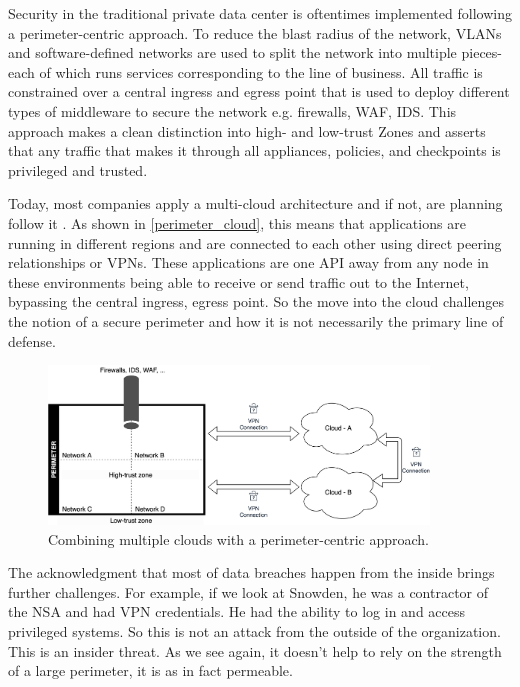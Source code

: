 \documentclass[runningheads]{llncs}
\begin{document}
Security in the traditional private data center is oftentimes implemented following a perimeter-centric approach. To reduce the blast radius of the network, VLANs and software-defined networks are used to split the network into multiple pieces-each of which runs services corresponding to the line of business. All traffic is constrained over a central ingress and egress point that is used to deploy different types of middleware to secure the network e.g. firewalls, WAF, IDS. This approach makes a clean distinction into high- and low-trust Zones and asserts that any traffic that makes it through all appliances, policies, and checkpoints is privileged and trusted. 

Today, most companies apply a multi-cloud architecture and if not, are planning follow it \cite{ref_url_ibm}. As shown in \autoref{perimeter_cloud}, this means that applications are running in different regions and are connected to each other using direct peering relationships or VPNs. These applications are one API away from any node in these environments being able to receive or send traffic out to the Internet, bypassing the central ingress, egress point. So the move into the cloud challenges the notion of a secure perimeter and how it is not necessarily the primary line of defense.

\begin{figure}
    \centering
    \includegraphics[width=0.9\textwidth]{images/nsip_perimeter_cloud.png}
    \caption{Combining multiple clouds with a perimeter-centric approach.}
    \label{perimeter_cloud}
\end{figure}

The acknowledgment that most of data breaches happen from the inside \cite{ref_url_verizon} brings further challenges. For example, if we look at Snowden, he was a contractor of the NSA and had VPN credentials. He had the ability to log in and access privileged systems. So this is not an attack from the outside of the organization. This is an insider threat. As we see again, it doesn't help to rely on the strength of a large perimeter, it is as in fact permeable.
\end{document}
